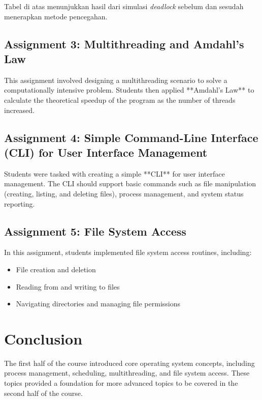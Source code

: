 \documentclass[12pt]{article}
\begin{document}
Tabel di atas menunjukkan hasil dari simulasi \textit{deadlock} sebelum dan sesudah menerapkan metode pencegahan.


\subsection{Assignment 3: Multithreading and Amdahl's Law}
This assignment involved designing a multithreading scenario to solve a computationally intensive problem. Students then applied **Amdahl's Law** to calculate the theoretical speedup of the program as the number of threads increased.

\subsection{Assignment 4: Simple Command-Line Interface (CLI) for User Interface Management}
Students were tasked with creating a simple **CLI** for user interface management. The CLI should support basic commands such as file manipulation (creating, listing, and deleting files), process management, and system status reporting.

\subsection{Assignment 5: File System Access}
In this assignment, students implemented file system access routines, including:
\begin{itemize}
    \item File creation and deletion
    \item Reading from and writing to files
    \item Navigating directories and managing file permissions
\end{itemize}

\section{Conclusion}
The first half of the course introduced core operating system concepts, including process management, scheduling, multithreading, and file system access. These topics provided a foundation for more advanced topics to be covered in the second half of the course.
\end{document}

